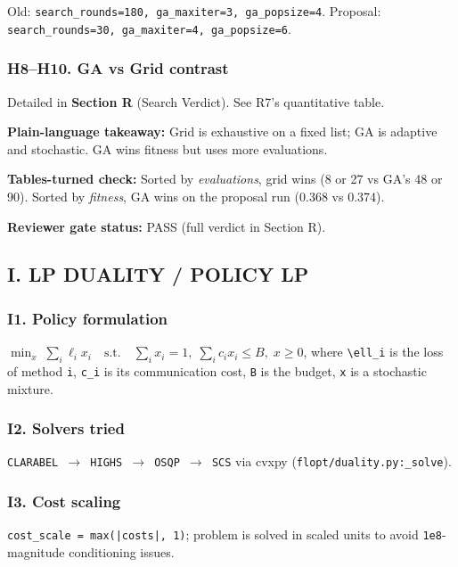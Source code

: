 \documentclass{article}
\begin{document}
Old: \texttt{search\_rounds=180, ga\_maxiter=3, ga\_popsize=4}. Proposal: \texttt{search\_rounds=30, ga\_maxiter=4, ga\_popsize=6}.


\subsubsection{H8--H10. GA vs Grid contrast}


Detailed in \textbf{Section R} (Search Verdict). See R7's quantitative table.


\textbf{Plain-language takeaway:} Grid is exhaustive on a fixed list; GA is adaptive and stochastic. GA wins fitness but uses more evaluations.


\textbf{Tables-turned check:} Sorted by \emph{evaluations}, grid wins (8 or 27 vs GA's 48 or 90). Sorted by \emph{fitness}, GA wins on the proposal run (0.368 vs 0.374).


\textbf{Reviewer gate status:} PASS (full verdict in Section R).


\subsection{I. LP DUALITY / POLICY LP}


\subsubsection{I1. Policy formulation}


\(\min_x \;\sum_i \ell_i x_i \quad \text{s.t.} \quad \sum_i x_i = 1,\; \sum_i c_i x_i \le B,\; x \ge 0\), where \texttt{\textbackslash{}ell\_i} is the loss of method \texttt{i}, \texttt{c\_i} is its communication cost, \texttt{B} is the budget, \texttt{x} is a stochastic mixture.


\subsubsection{I2. Solvers tried}


\texttt{CLARABEL \ensuremath{\rightarrow} HIGHS \ensuremath{\rightarrow} OSQP \ensuremath{\rightarrow} SCS} via cvxpy (\texttt{flopt/duality.py:\_solve}).


\subsubsection{I3. Cost scaling}


\texttt{cost\_scale = max(|costs|, 1)}; problem is solved in scaled units to avoid \texttt{1e8}-magnitude conditioning issues.
\end{document}

